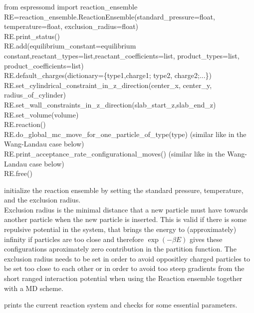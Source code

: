   \begin{pysyntax}
  	from espressomd import reaction_ensemble \\
  	  RE=reaction_ensemble.ReactionEnsemble(standard_pressure=float, temperature=float, exclusion_radius=float) \\
  	  RE.print_status() \\
  	  RE.add(equilibrium_constant=equilibrium constant,reactant_types=list,reactant_coefficients=list, product_types=list, product_coefficients=list) \\
  	  RE.default_charges(dictionary=\{type1,charge1; type2, charge2;...\}) \\
  	  RE.set_cylindrical_constraint_in_z_direction(center_x, center_y, radius_of_cylinder) \\
  	  RE.set_wall_constraints_in_z_direction(slab_start_z,slab_end_z) \\
	  RE.set_volume(volume) \\
	  RE.reaction() \\
	  RE.do_global_mc_move_for_one_particle_of_type(type) (similar like in the Wang-Landau case below) \\
	 RE.print_acceptance_rate_configurational_moves() (similar like in the Wang-Landau case below) \\
	 RE.free() 
	\begin{features}
	\end{features}
\end{pysyntax}
  
 initialize the reaction ensemble by setting the standard pressure, temperature, and the exclusion radius.\\
Exclusion radius is the minimal distance that a new
particle must have towards another particle when the new particle is inserted.
This is valid if there is some repulsive potential in the system, that brings
the energy to (approximately) infinity if particles are too close and therefore
$\exp(-\beta E)$ gives these configurations aproximately zero contribution in
the partition function. The exclusion radius needs to be set in order to avoid oppositley charged particles to be set too close to each other or in order to avoid too steep gradients from the short ranged interaction potential when using the Reaction ensemble together with a MD scheme.

 prints the current reaction system and checks for some essential parameters.

